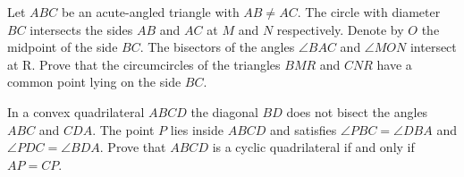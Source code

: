 
\begin{exercise}[1/2004]
    Let $ABC$ be an acute-angled triangle with $AB \neq AC$.
    The circle with diameter $BC$ intersects the sides $AB$ and $AC$ at $M$ and $N$ respectively.
    Denote by $O$ the midpoint of the side $BC$.
    The bisectors of the angles $\angle BAC$ and $\angle MON$ intersect at R.
    Prove that the circumcircles of the triangles $BMR$ and $CNR$ have a common point lying on the side $BC$.
\end{exercise}

\begin{exercise}[5/2004]
    In a convex quadrilateral $ABCD$ the diagonal $BD$ does not bisect the angles $ABC$ and $CDA$.
    The point $P$ lies inside $ABCD$ and satisfies $\angle PBC = \angle DBA$ and $\angle PDC = \angle BDA$.
    Prove that $ABCD$ is a cyclic quadrilateral if and only if $AP = CP$.
\end{exercise}
